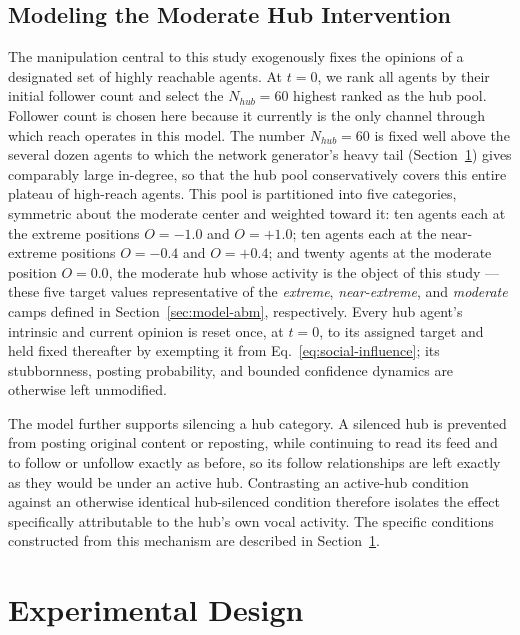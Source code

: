 \documentclass{svproc}
\begin{document}
\subsection{Modeling the Moderate Hub Intervention}\label{sec:model-intervention}
The manipulation central to this study exogenously
fixes the opinions of a designated set of
highly reachable agents.
At $t=0$, we rank all agents by their initial
follower count and select the $N_{hub}=60$
highest ranked as the hub pool.
Follower count is chosen here because it currently 
is the 
only channel through which reach operates in this
model. 
The number $N_{hub}=60$ is fixed well above
the several dozen agents
to which the network generator's heavy tail
(Section~\ref{sec:experiments}) gives comparably
large in-degree, so that the hub pool conservatively
covers this entire plateau of high-reach agents.
This pool is partitioned into five categories,
symmetric about the moderate center and
weighted toward it: ten agents each at
the extreme positions $O=-1.0$ and $O=+1.0$;
ten agents each at the near-extreme positions
$O=-0.4$ and $O=+0.4$; and twenty agents
at the moderate position $O=0.0$,
the moderate hub whose activity is
the object of this study --- these five target
values representative of the \emph{extreme},
\emph{near-extreme}, and \emph{moderate} camps
defined in Section~\ref{sec:model-abm},
respectively.
Every hub agent's intrinsic and current 
opinion is reset once, at $t=0$, to its assigned 
target and held fixed thereafter by exempting 
it from Eq.~\eqref{eq:social-influence}; its stubbornness, 
posting probability, and bounded confidence 
dynamics are otherwise left unmodified.

The model further supports silencing a hub
category. A silenced hub is prevented from
posting original content or reposting,
while continuing to read its feed and to
follow or unfollow exactly as before, so its
follow relationships are left exactly as
they would be under an active hub.
Contrasting an active-hub condition against
an otherwise identical hub-silenced
condition therefore isolates the effect
specifically attributable to the hub's own
vocal activity. The specific conditions
constructed from this mechanism are
described in Section~\ref{sec:experiments}.

\section{Experimental Design}\label{sec:experiments}
\end{document}
